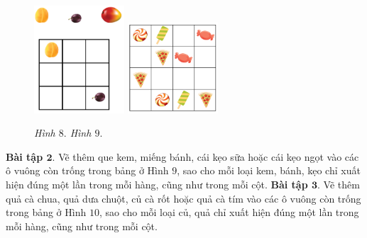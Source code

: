 	\begin{figure}[H]
		\vspace*{-5pt}
		\centering
		\captionsetup{labelformat=empty, justification=centering}
		\includegraphics[width=0.30\textwidth]{hinh8}\hspace{40pt}
		\includegraphics[width=0.30\textwidth]{hinh10}

		\caption{\textit{\small Hình $8.$ \hspace*{100pt} Hình $9.$}} %
		\vspace*{-10pt}
	\end{figure}
	\textbf{Bài tập $\pmb{2.}$} Vẽ thêm que kem, miếng bánh, cái kẹo sữa hoặc cái kẹo ngọt vào các ô vuông còn trống trong bảng ở Hình $9$, sao cho mỗi loại kem, bánh, kẹo chỉ xuất hiện đúng một lần trong mỗi hàng, cũng như trong mỗi cột.
	\vskip 0.1cm
	\textbf{Bài tập $\pmb{3.}$} Vẽ thêm quả cà chua, quả dưa chuột, củ cà rốt hoặc quả cà tím vào các ô vuông còn trống trong bảng ở Hình $10$, sao cho mỗi loại củ, quả chỉ xuất hiện đúng một lần trong mỗi hàng, cũng như trong mỗi cột.
